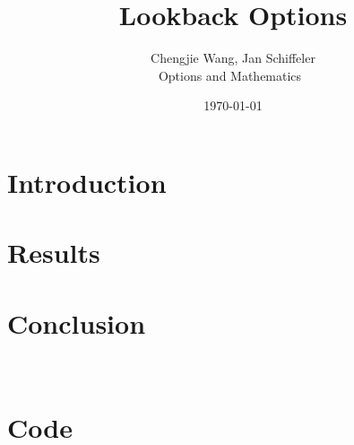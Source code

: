 \documentclass[12pt]{article}
\title{Lookback Options} %
\author{Chengjie Wang, Jan Schiffeler\\ 
Options and Mathematics\ 
}
\date{\today} %
\begin{document}
\setlength{\droptitle}{-5em}     
\maketitle

\section{Introduction}


\section{Results}


\section{Conclusion}


\parencite{construction_2008}\\


\printbibliography

\newpage
\section*{Code}

\end{document}
